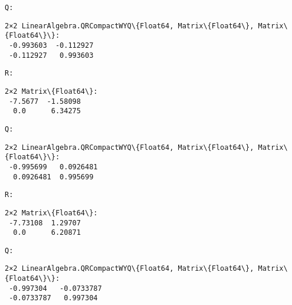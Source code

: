 \documentclass[11pt]{article}
\begin{document}
    
    \begin{Verbatim}[commandchars=\\\{\}]
Q:
    \end{Verbatim}

    
    \begin{Verbatim}[commandchars=\\\{\}]
2×2 LinearAlgebra.QRCompactWYQ\{Float64, Matrix\{Float64\}, Matrix\{Float64\}\}:
 -0.993603  -0.112927
 -0.112927   0.993603
    \end{Verbatim}

    
    \begin{Verbatim}[commandchars=\\\{\}]
R:
    \end{Verbatim}

    
    \begin{Verbatim}[commandchars=\\\{\}]
2×2 Matrix\{Float64\}:
 -7.5677  -1.58098
  0.0      6.34275
    \end{Verbatim}

    
    \begin{Verbatim}[commandchars=\\\{\}]
Q:
    \end{Verbatim}

    
    \begin{Verbatim}[commandchars=\\\{\}]
2×2 LinearAlgebra.QRCompactWYQ\{Float64, Matrix\{Float64\}, Matrix\{Float64\}\}:
 -0.995699   0.0926481
  0.0926481  0.995699
    \end{Verbatim}

    
    \begin{Verbatim}[commandchars=\\\{\}]
R:
    \end{Verbatim}

    
    \begin{Verbatim}[commandchars=\\\{\}]
2×2 Matrix\{Float64\}:
 -7.73108  1.29707
  0.0      6.20871
    \end{Verbatim}

    
    \begin{Verbatim}[commandchars=\\\{\}]
Q:
    \end{Verbatim}

    
    \begin{Verbatim}[commandchars=\\\{\}]
2×2 LinearAlgebra.QRCompactWYQ\{Float64, Matrix\{Float64\}, Matrix\{Float64\}\}:
 -0.997304   -0.0733787
 -0.0733787   0.997304
    \end{Verbatim}
\end{document}
